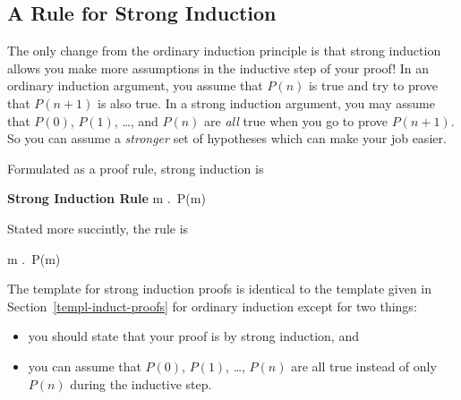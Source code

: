 \subsection{A Rule for Strong Induction}


The only change from the ordinary induction principle is that strong
induction allows you make more assumptions in the inductive step of
your proof!  In an ordinary induction argument, you assume that $P(n)$
is true and try to prove that $P(n+1)$ is also true.  In a strong
induction argument, you may assume that $P(0)$, $P(1)$, \dots, and
$P(n)$ are \emph{all} true when you go to prove $P(n+1)$.  So you can
assume a \emph{stronger} set of hypotheses which can make your job
easier.

Formulated as a proof rule, strong induction is
\begin{rul*} \textbf{Strong Induction Rule}
{\forall m \in \nngint.\, P(m)}
\end{rul*}

Stated more succintly, the rule is
\begin{rul*}%
{\forall m \in \nngint.\, P(m)}
\end{rul*}

The template for strong induction proofs is identical to the template
given in Section~\ref{templ-induct-proofs} for ordinary induction
except for two things:
\begin{itemize}

\item
you should state that your proof is by strong induction, and

\item
you can assume that $P(0)$, $P(1)$, \dots, $P(n)$ are all true instead
of only $P(n)$ during the inductive step.

\end{itemize}

